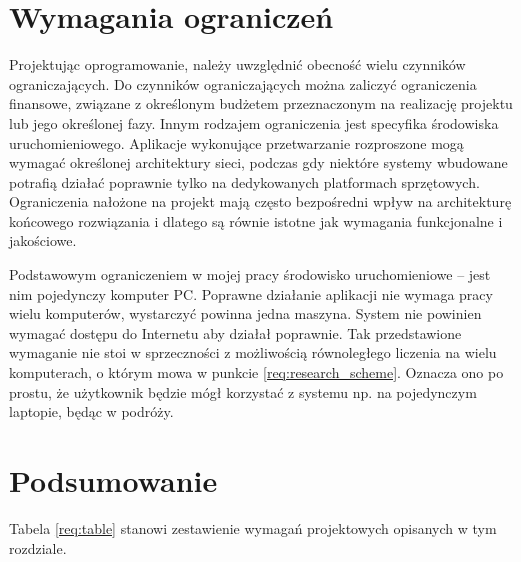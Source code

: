 \documentclass[../thesis.tex]{subfiles}
\begin{document}
\section{Wymagania ograniczeń}

Projektując oprogramowanie, należy uwzględnić obecność wielu czynników ograniczających. Do czynników ograniczających można zaliczyć ograniczenia finansowe, związane z określonym budżetem przeznaczonym na realizację projektu lub jego określonej fazy. Innym rodzajem ograniczenia jest specyfika środowiska uruchomieniowego. Aplikacje wykonujące przetwarzanie rozproszone mogą wymagać określonej architektury sieci, podczas gdy niektóre systemy wbudowane potrafią działać poprawnie tylko na dedykowanych platformach sprzętowych. Ograniczenia nałożone na projekt mają często bezpośredni wpływ na architekturę końcowego rozwiązania i dlatego są równie istotne jak wymagania funkcjonalne i jakościowe.

Podstawowym ograniczeniem w mojej pracy środowisko uruchomieniowe -- jest nim pojedynczy komputer PC. Poprawne działanie aplikacji nie wymaga pracy wielu komputerów, wystarczyć powinna jedna maszyna.  System nie powinien wymagać dostępu do Internetu aby działał poprawnie. Tak przedstawione wymaganie nie stoi w sprzeczności z możliwością równoległego liczenia na wielu komputerach, o którym mowa w punkcie \ref{req:research_scheme}. Oznacza ono po prostu, że użytkownik będzie mógł korzystać z systemu np. na pojedynczym laptopie, będąc w podróży.

\section{Podsumowanie}

Tabela \ref{req:table} stanowi zestawienie wymagań projektowych opisanych w tym rozdziale.
\end{document}
